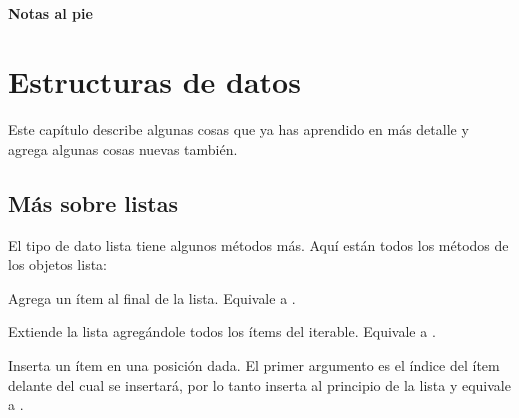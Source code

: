 \documentclass[a4,10pt,spanish]{sphinxmanual}
\begin{document}
\subsubsection*{Notas al pie}


\chapter{Estructuras de datos}
\label{\detokenize{tutorial/datastructures:data-structures}}\label{\detokenize{tutorial/datastructures:tut-structures}}\label{\detokenize{tutorial/datastructures::doc}}
\sphinxAtStartPar
Este capítulo describe algunas cosas que ya has aprendido en más detalle y agrega algunas cosas nuevas también.


\section{Más sobre listas}
\label{\detokenize{tutorial/datastructures:more-on-lists}}\label{\detokenize{tutorial/datastructures:tut-morelists}}
\sphinxAtStartPar
El tipo de dato lista tiene algunos métodos más. Aquí están todos los métodos de los objetos lista:


\begin{fulllineitems}
\sphinxAtStartPar
Agrega un ítem al final de la lista. Equivale a .

\end{fulllineitems}



\begin{fulllineitems}
\sphinxAtStartPar
Extiende la lista agregándole todos los ítems del iterable. Equivale a .

\end{fulllineitems}



\begin{fulllineitems}
\sphinxAtStartPar
Inserta un ítem en una posición dada. El primer argumento es el índice del ítem delante del cual se insertará, por lo tanto  inserta al principio de la lista y  equivale a .

\end{fulllineitems}
\end{document}
